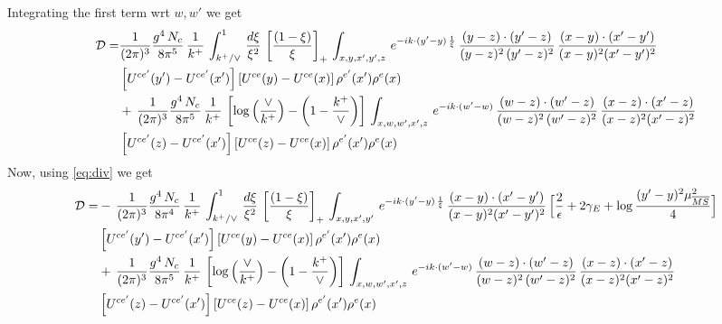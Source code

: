 \documentclass[9pt]{article}
\numberwithin{equation}{section}
\begin{document}
Integrating the first term wrt $w, w'$ we get
\begin{align}\label{eq:yform}
     \mathcal{D} = &\frac{1}{(2\pi)^{3}}\frac{g^{4}\,N_{c}}{8\pi^{5}}\,\frac{1}{k^{+}}\,\int_{k^{+}/\vee}^{1}\,\frac{d\xi}{\xi^{2}}\,\left[\frac{(1-\xi)}{\xi}\right]_{+}\,\int_{x,y,x',y',z}\,e^{-ik\cdot(y'-y)\,\frac{1}{\xi}}\,\frac{(y-z)\cdot (y'-z)}{(y-z)^{2}\, (y'-z)^{2}}\,\frac{(x-y)\cdot(x'-y')}{(x-y)^{2}(x'-y')^{2}}\notag \\ &\left[U^{ce'}(y')-U^{ce'}(x')\right]\left[U^{ce}(y)-U^{ce}(x)\right]\rho^{e'}(x')\rho^{e}(x)\notag \\ & +\,\frac{1}{(2\pi)^{3}}\frac{g^{4}\,N_{c}}{8\pi^{5}}\,\frac{1}{k^{+}}\,\left[\log{\left(\frac{\vee}{k^{+}}\right)} - \left(1-\frac{k^{+}}{\vee}\right)\right]\,\int_{x,w,w',x',z}\,e^{-ik\cdot(w'-w)}\,\frac{(w-z)\cdot (w'-z)}{(w-z)^{2}\, (w'-z)^{2}}\,\frac{(x-z)\cdot(x'-z)}{(x-z)^{2}(x'-z)^{2}}\notag \\ & \left[U^{ce'}(z)-U^{ce'}(x')\right]\left[U^{ce}(z)-U^{ce}(x)\right]\rho^{e'}(x')\rho^{e}(x)
\end{align}
Now, using \eqref{eq:div} we get
\begin{align}\label{eq:lepsform}
     \mathcal{D} = &-\,\frac{1}{(2\pi)^{3}}\frac{g^{4}\,N_{c}}{8\pi^{4}}\,\frac{1}{k^{+}}\,\int_{k^{+}/\vee}^{1}\,\frac{d\xi}{\xi^{2}}\,\left[\frac{(1-\xi)}{\xi}\right]_{+}\,\int_{x,y,x',y'}\,e^{-ik\cdot(y'-y)\,\frac{1}{\xi}}\,\frac{(x-y)\cdot(x'-y')}{(x-y)^{2}(x'-y')^{2}}\,\Big[\frac{2}{\epsilon}+2\gamma_{E}+\log\frac{(y'-y)^{2}\mu^{2}_{\overline{MS}}}{4}\Big]\notag \\ &\left[U^{ce'}(y')-U^{ce'}(x')\right]\left[U^{ce}(y)-U^{ce}(x)\right]\rho^{e'}(x')\rho^{e}(x)\notag \\ & +\,\frac{1}{(2\pi)^{3}}\frac{g^{4}\,N_{c}}{8\pi^{5}}\,\frac{1}{k^{+}}\,\left[\log{\left(\frac{\vee}{k^{+}}\right)} - \left(1-\frac{k^{+}}{\vee}\right)\right]\,\int_{x,w,w',x',z}\,e^{-ik\cdot(w'-w)}\,\frac{(w-z)\cdot (w'-z)}{(w-z)^{2}\, (w'-z)^{2}}\,\frac{(x-z)\cdot(x'-z)}{(x-z)^{2}(x'-z)^{2}}\notag \\ & \left[U^{ce'}(z)-U^{ce'}(x')\right]\left[U^{ce}(z)-U^{ce}(x)\right]\rho^{e'}(x')\rho^{e}(x)
\end{align}
\end{document}
